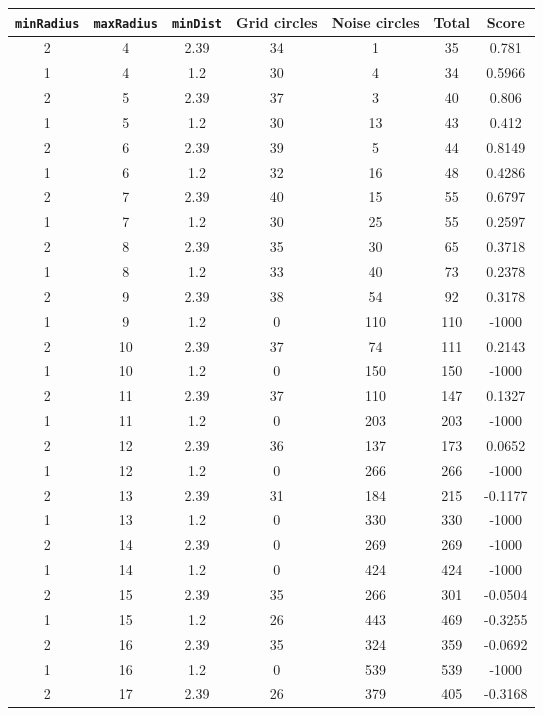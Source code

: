 \documentclass[letterpaper, 12pt]{article}
\begin{document}
\begin{longtable}{|c|c|c|c|c|c|c|}
\hline
\textbf{\texttt{minRadius}} & \textbf{\texttt{maxRadius}} & \textbf{\texttt{minDist}} & \textbf{Grid circles} & \textbf{Noise circles} & \textbf{Total} & \textbf{Score} \\
\hline
2 & 4 & 2.39 & 34 & 1 & 35 & 0.781 \\
\hline
1 & 4 & 1.2 & 30 & 4 & 34 & 0.5966 \\
\hline
2 & 5 & 2.39 & 37 & 3 & 40 & 0.806 \\
\hline
1 & 5 & 1.2 & 30 & 13 & 43 & 0.412 \\
\hline
2 & 6 & 2.39 & 39 & 5 & 44 & 0.8149 \\
\hline
1 & 6 & 1.2 & 32 & 16 & 48 & 0.4286 \\
\hline
2 & 7 & 2.39 & 40 & 15 & 55 & 0.6797 \\
\hline
1 & 7 & 1.2 & 30 & 25 & 55 & 0.2597 \\
\hline
2 & 8 & 2.39 & 35 & 30 & 65 & 0.3718 \\
\hline
1 & 8 & 1.2 & 33 & 40 & 73 & 0.2378 \\
\hline
2 & 9 & 2.39 & 38 & 54 & 92 & 0.3178 \\
\hline
1 & 9 & 1.2 & 0 & 110 & 110 & -1000 \\
\hline
2 & 10 & 2.39 & 37 & 74 & 111 & 0.2143 \\
\hline
1 & 10 & 1.2 & 0 & 150 & 150 & -1000 \\
\hline
2 & 11 & 2.39 & 37 & 110 & 147 & 0.1327 \\
\hline
1 & 11 & 1.2 & 0 & 203 & 203 & -1000 \\
\hline
2 & 12 & 2.39 & 36 & 137 & 173 & 0.0652 \\
\hline
1 & 12 & 1.2 & 0 & 266 & 266 & -1000 \\
\hline
2 & 13 & 2.39 & 31 & 184 & 215 & -0.1177 \\
\hline
1 & 13 & 1.2 & 0 & 330 & 330 & -1000 \\
\hline
2 & 14 & 2.39 & 0 & 269 & 269 & -1000 \\
\hline
1 & 14 & 1.2 & 0 & 424 & 424 & -1000 \\
\hline
2 & 15 & 2.39 & 35 & 266 & 301 & -0.0504 \\
\hline
1 & 15 & 1.2 & 26 & 443 & 469 & -0.3255 \\
\hline
2 & 16 & 2.39 & 35 & 324 & 359 & -0.0692 \\
\hline
1 & 16 & 1.2 & 0 & 539 & 539 & -1000 \\
\hline
2 & 17 & 2.39 & 26 & 379 & 405 & -0.3168 \\

\end{longtable}
\end{document}
